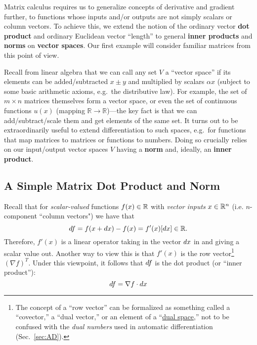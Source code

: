 Matrix calculus
requires us  to generalize concepts of derivative and gradient further, to functions whose inputs and/or outputs are not simply scalars or column vectors.  To achieve this, we extend the notion of the ordinary vector \textbf{dot product} and
ordinary Euclidean vector ``length'' to
general \textbf{inner products} and \textbf{norms} on 
\textbf{vector spaces}.
Our first example will consider familiar matrices
from this point of view.

Recall from linear algebra that we can call any set $V$ a ``vector space'' if its elements can be added/subtracted $x \pm y$ and multiplied by scalars $\alpha x$ (subject to some basic arithmetic axioms, e.g.~the  distributive law).  For example, the set of $m \times n$ matrices themselves form a vector space, or even the set of continuous functions $u(x)$ (mapping $\mathbb{R} \to \mathbb{R}$)---the key fact is that we can add/subtract/scale them and get elements of the same set.  It turns out to be extraordinarily useful to extend differentiation to such spaces, e.g.~for functions that map matrices to matrices or functions to numbers.  Doing so crucially relies on our input/output vector spaces $V$ having a \textbf{norm} and, ideally, an \textbf{inner product}.

\subsection{A Simple Matrix Dot Product and Norm}




Recall that for \textit{scalar-valued} functions $f(x) \in \mathbb R$ with \textit{vector inputs} $x\in \mathbb R^n$ (i.e. $n$-component ``column vectors") we have that 
    \[
    d f = f(x + d x) - f(x) = f'(x) [d x] \in \mathbb R.
    \]
    Therefore, $f'(x)$ is a linear operator taking in the vector $d x$ in and giving a scalar value out. Another way to view this is that $f'(x)$ is the row vector\footnote{The concept of a ``row vector'' can be formalized as something called a ``covector,'' a ``dual vector,'' or an element of a ``\href{https://en.wikipedia.org/wiki/Dual_space}{dual space},'' not to be confused with the \emph{dual numbers} used in automatic differentiation (Sec.~\ref{sec:AD}).}  $(\nabla f)^T$. Under this viewpoint, it follows that $d f$ is the dot product (or ``inner product''):
    \[
    d f = \nabla f \cdot d x
    \]

